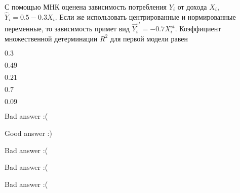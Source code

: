 
\begin{question}
С помощью МНК оценена зависимость потребления \(Y_i\) от дохода \(X_i\), \(\hat Y_i = 0.5 - 0.3 X_i\). Если же использовать центрированные и нормированные переменные, то зависимость примет вид \(\hat Y_i^{st} = -0.7 X_i^{st}\). Коэффициент множественной детерминации \(R^2\) для первой модели равен
\begin{answerlist}
  \item \(0.3\)
  \item \(0.49\)
  \item \(0.21\)
  \item \(0.7\)
  \item \(0.09\)
\end{answerlist}
\end{question}

\begin{solution}
\begin{answerlist}
  \item Bad answer :(
  \item Good answer :)
  \item Bad answer :(
  \item Bad answer :(
  \item Bad answer :(
\end{answerlist}
\end{solution}

